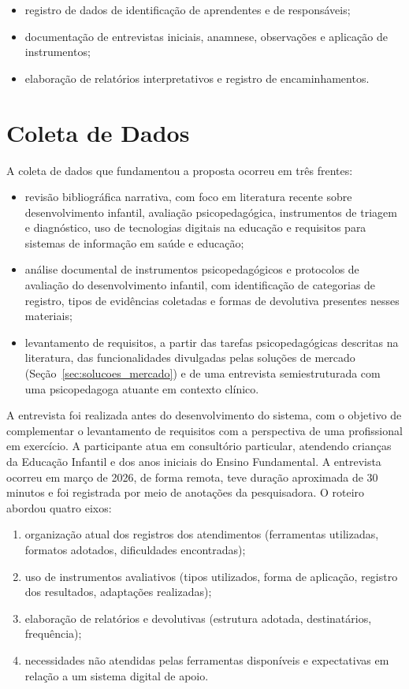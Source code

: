 \begin{itemize}
    \item registro de dados de identificação de aprendentes e de responsáveis;
    \item documentação de entrevistas iniciais, anamnese, observações e aplicação de instrumentos;
    \item elaboração de relatórios interpretativos e registro de encaminhamentos.
\end{itemize}

\section{Coleta de Dados}\label{sec:coleta_dados}

A coleta de dados que fundamentou a proposta ocorreu em três frentes:

\begin{itemize}
    \item revisão bibliográfica narrativa, com foco em literatura recente sobre desenvolvimento infantil, avaliação psicopedagógica, instrumentos de triagem e diagnóstico, uso de tecnologias digitais na educação e requisitos para sistemas de informação em saúde e educação;
    \item análise documental de instrumentos psicopedagógicos e protocolos de avaliação do desenvolvimento infantil, com identificação de categorias de registro, tipos de evidências coletadas e formas de devolutiva presentes nesses materiais;
    \item levantamento de requisitos, a partir das tarefas psicopedagógicas descritas na literatura, das funcionalidades divulgadas pelas soluções de mercado (Seção~\ref{sec:solucoes_mercado}) e de uma entrevista semiestruturada com uma psicopedagoga atuante em contexto clínico.
\end{itemize}

A entrevista foi realizada antes do desenvolvimento do sistema, com o objetivo de complementar o levantamento de requisitos com a perspectiva de uma profissional em exercício. A participante atua em consultório particular, atendendo crianças da Educação Infantil e dos anos iniciais do Ensino Fundamental. A entrevista ocorreu em março de 2026, de forma remota, teve duração aproximada de 30 minutos e foi registrada por meio de anotações da pesquisadora. O roteiro abordou quatro eixos:

\begin{enumerate}
    \item organização atual dos registros dos atendimentos (ferramentas utilizadas, formatos adotados, dificuldades encontradas);
    \item uso de instrumentos avaliativos (tipos utilizados, forma de aplicação, registro dos resultados, adaptações realizadas);
    \item elaboração de relatórios e devolutivas (estrutura adotada, destinatários, frequência);
    \item necessidades não atendidas pelas ferramentas disponíveis e expectativas em relação a um sistema digital de apoio.
\end{enumerate}

